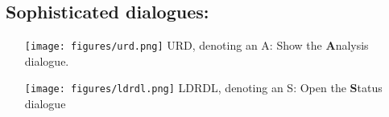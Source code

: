 \subsection*{Sophisticated dialogues:}
\begin{itemize}
\item[\raisebox{-1em}
{\texttt{[image: figures/urd.png]}}] URD, denoting an A: Show the \textbf{A}nalysis dialogue.
\item[\raisebox{-1em}
{\texttt{[image: figures/ldrdl.png]}}] LDRDL, denoting an S: Open the \textbf{S}tatus dialogue
\end{itemize}
